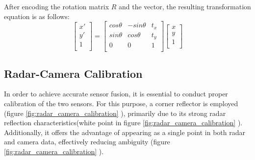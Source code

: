 After encoding the rotation matrix $R$ and the vector, the resulting transformation equation is as follows:
\begin{equation}\label{equ:2d_trans_eq}
    \begin{bmatrix}
        x'\\ 
        y'\\
        1\\
    \end{bmatrix}=
    \begin{bmatrix}
    cos\theta & -sin\theta & t_x\\
    sin\theta & cos\theta & t_y\\
    0 & 0 & 1\\
    \end{bmatrix}
    \begin{bmatrix}
        x\\ 
        y\\
        1\\
    \end{bmatrix}
\end{equation}

\newpage
\subsection{Radar-Camera Calibration}
In order to achieve accurate sensor fusion, it is essential to conduct proper calibration of the two sensors. 
For this purpose, a corner reflector is employed (figure \ref*{fig:radar_camera_calibration} ), primarily due to its strong radar reflection characteristics(white point in figure \ref*{fig:radar_camera_calibration} ). 
Additionally, it offers the advantage of appearing as a single point in both radar and camera data, effectively reducing ambiguity (figure \ref*{fig:radar_camera_calibration} ).

